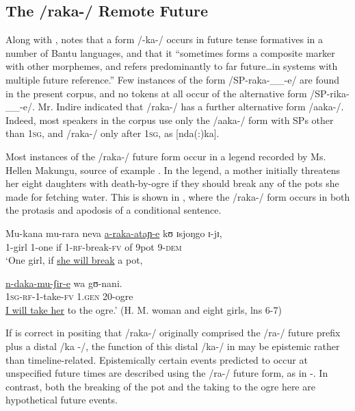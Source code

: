\documentclass[output=paper]{langsci/langscibook}
\begin{document}
\subsection{The /raka-/ Remote Future}\label{sec:sarvasy:6.1}

Along with \citet{Botne1999}, \citet[85]{Nurse2008} notes that a form /-ka-/ occurs in future tense formatives in a number of Bantu languages, and that it “sometimes forms a composite marker with other morphemes, and refers predominantly to far future\ldots in systems with multiple future reference.” Few instances of the form /SP-raka-\_\_-e/ are found in the present corpus, and no tokens at all occur of the alternative form /SP-rika-\_\_-e/. Mr. Indire indicated that /raka-/ has a further alternative form /aaka-/. Indeed, most speakers in the corpus use only the /aaka-/ form with SPs other than \textsc{1sg}, and /raka-/ only after \textsc{1sg}, as [nda(:)ka].

Most instances of the /raka-/ future form occur in a legend recorded by Ms. Hellen Makungu, source of example . In the legend, a mother initially threatens her eight daughters with death-by-ogre if they should break any of the pots she made for fetching water. This is shown in , where the /raka-/ form occurs in both the protasis and apodosis of a conditional sentence. 

\ea\label{ex:sarvasy:14}
\gll Mu-kana   mu-rara   neva   \underline{a-raka-ataɲ-e}   kʊ     ɪsjoŋgo   ɪ{}-jɪ,  \\
1-girl    1-one    if  1-\textsc{rf}{}-break-\textsc{fv}  of  9pot   9-\textsc{dem} \\
\glt ‘One girl, if \underline{she will break} a pot,

\gll \underline{n-daka-mu-ʃir-e}   wa   gʊ-nani. \\
\textsc{1sg-rf-}1-take-\textsc{fv}  1.\textsc{gen}  20-ogre \\
\glt \underline{I will take her} to the ogre.’ (H. M. woman and eight girls, lns 6-7)
\z

If \citet{Botne1999} is correct in positing that /raka-/ originally comprised the /ra-/ future prefix plus a distal /ka%
%
{}-/, the function of this distal /ka-/ in  may be epistemic rather than timeline-related. Epistemically certain events predicted to occur at unspecified future times are described using the /ra-/ future form, as in -. In contrast, both the breaking of the pot and the taking to the ogre here are hypothetical future events. 
\end{document}

